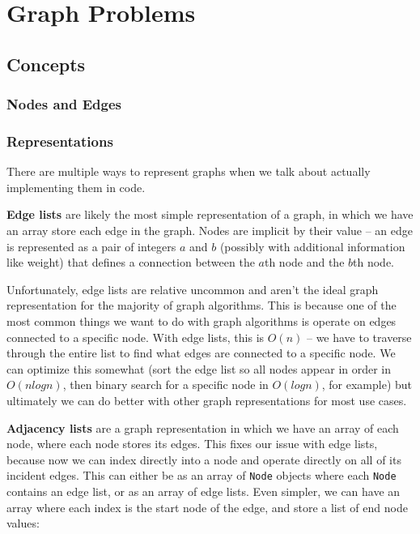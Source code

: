 \section{Graph Problems}
\subsection{Concepts}
\subsubsection{Nodes and Edges}
\subsubsection{Representations}

There are multiple ways to represent graphs when we talk about actually implementing them in code.

\textbf{Edge lists} are likely the most simple representation of a graph, in which we have an array store each edge in the graph. Nodes are implicit by their value -- an edge is represented as a pair of integers $a$ and $b$ (possibly with additional information like weight) that defines a connection between the $a$th node and the $b$th node.


Unfortunately, edge lists are relative uncommon and aren't the ideal graph representation for the majority of graph algorithms. This is because one of the most common things we want to do with graph algorithms is operate on edges connected to a specific node. With edge lists, this is $O(n)$ -- we have to traverse through the entire list to find what edges are connected to a specific node. We can optimize this somewhat (sort the edge list so all nodes appear in order in $O(n log n)$, then binary search for a specific node in $O(log n)$, for example) but ultimately we can do better with other graph representations for most use cases.

\textbf{Adjacency lists} are a graph representation in which we have an array of each node, where each node stores its edges. This fixes our issue with edge lists, because now we can index directly into a node and operate directly on all of its incident edges. This can either be as an array of \texttt{Node} objects where each \texttt{Node} contains an edge list, or as an array of edge lists. Even simpler, we can have an array where each index is the start node of the edge, and store a list of end node values:

